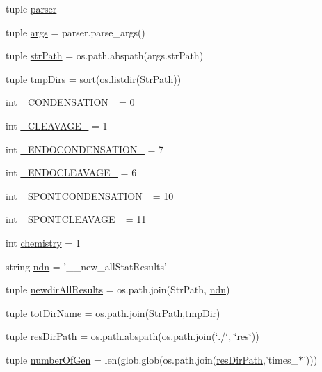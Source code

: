 \begin{DoxyCompactItemize}
\item 
tuple \hyperlink{a00098_adba84e3872cb47cad219837458e56677}{parser}
\item 
tuple \hyperlink{a00098_afa2d0b9fb021746e05cd06277997da04}{args} = parser.\-parse\-\_\-args()
\item 
tuple \hyperlink{a00098_a8932cabcf73065a531104c53a324508a}{str\-Path} = os.\-path.\-abspath(args.\-str\-Path)
\item 
tuple \hyperlink{a00098_af740eb0100dc7010628161baeaf9b474}{tmp\-Dirs} = sort(os.\-listdir(Str\-Path))
\item 
int \hyperlink{a00098_aad87b9d241bea71df95c318686aca066}{\-\_\-\-C\-O\-N\-D\-E\-N\-S\-A\-T\-I\-O\-N\-\_\-} = 0
\item 
int \hyperlink{a00098_af81d6d0377f4d99177961a5604f58ed2}{\-\_\-\-C\-L\-E\-A\-V\-A\-G\-E\-\_\-} = 1
\item 
int \hyperlink{a00098_a0637697acae236afe5e5ae8dc1d85431}{\-\_\-\-E\-N\-D\-O\-C\-O\-N\-D\-E\-N\-S\-A\-T\-I\-O\-N\-\_\-} = 7
\item 
int \hyperlink{a00098_a4535f1f4043aef3195766733626b61e4}{\-\_\-\-E\-N\-D\-O\-C\-L\-E\-A\-V\-A\-G\-E\-\_\-} = 6
\item 
int \hyperlink{a00098_a33ff8ddc4a26ccd45029e2b369391aba}{\-\_\-\-S\-P\-O\-N\-T\-C\-O\-N\-D\-E\-N\-S\-A\-T\-I\-O\-N\-\_\-} = 10
\item 
int \hyperlink{a00098_a485cf1077a4ece847800617ede00e458}{\-\_\-\-S\-P\-O\-N\-T\-C\-L\-E\-A\-V\-A\-G\-E\-\_\-} = 11
\item 
int \hyperlink{a00098_ab4fd705796fd835a4238fecdc3caf76e}{chemistry} = 1
\item 
string \hyperlink{a00098_a5df7e71a36351afd3e59d6f50a94bdaf}{ndn} = '\-\_\-\_\-new\-\_\-all\-Stat\-Results'
\item 
tuple \hyperlink{a00098_ae53bd92b0509a8f35e92e734a7f4b4e1}{newdir\-All\-Results} = os.\-path.\-join(Str\-Path, \hyperlink{a00098_a5df7e71a36351afd3e59d6f50a94bdaf}{ndn})
\item 
tuple \hyperlink{a00098_a7883e37b9556e49968e7a7dd08893bfb}{tot\-Dir\-Name} = os.\-path.\-join(Str\-Path,tmp\-Dir)
\item 
tuple \hyperlink{a00098_abc625ab1aeed5741a02bbaccfbee5c06}{res\-Dir\-Path} = os.\-path.\-abspath(os.\-path.\-join(\char`\"{}./\char`\"{}, \char`\"{}res\char`\"{}))
\item 
tuple \hyperlink{a00098_acd3059fa3a61438f739193dc80f23b80}{number\-Of\-Gen} = len(glob.\-glob(os.\-path.\-join(\hyperlink{a00098_abc625ab1aeed5741a02bbaccfbee5c06}{res\-Dir\-Path},'times\-\_\-$\ast$')))

\end{DoxyCompactItemize}
